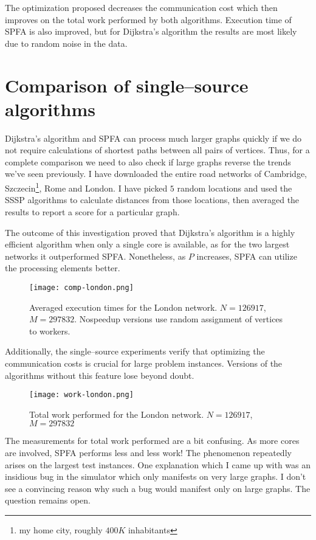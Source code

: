 \documentclass[12pt,a4paper,oneside,openright]{report}
\begin{document}
The optimization proposed decreases the communication cost which then improves on the total work performed by both algorithms. Execution time of SPFA is also improved, but for Dijkstra's algorithm the results are most likely due to random noise in the data.

\section{Comparison of single--source algorithms}
Dijkstra's algorithm and SPFA can process much larger graphs quickly if we do not require calculations of shortest paths between all pairs of vertices. Thus, for a complete comparison we need to also check if large graphs reverse the trends we've seen previously. I have downloaded the entire road networks of Cambridge, Szczecin\footnote{my home city, roughly $400K$ inhabitants}, Rome and London. I have picked $5$ random locations and used the SSSP algorithms to calculate distances from those locations, then averaged the results to report a score for a particular graph.

The outcome of this investigation proved that Dijkstra's algorithm is a highly efficient algorithm when only a single core is available, as for the two largest networks it outperformed SPFA. Nonetheless, as $P$ increases, SPFA can utilize the processing elements better.

\begin{figure}[ht]
\centering
\caption{Averaged execution times for the London network. $N=126917$, $M=297832$. Nospeedup versions use random assignment of vertices to workers.}
\texttt{[image: comp-london.png]}
\end{figure}

Additionally, the single--source experiments verify that optimizing the communication costs is crucial for large problem instances. Versions of the algorithms without this feature lose beyond doubt.

\begin{figure}[ht]
\centering
\caption{Total work performed for the London network. $N=126917$, $M=297832$}
\texttt{[image: work-london.png]}
\end{figure}

The measurements for total work performed are a bit confusing. As more cores are involved, SPFA performs less and less work! The phenomenon repeatedly arises on the largest test instances. One explanation which I came up with was an insidious bug in the simulator which only manifests on very large graphs. I don't see a convincing reason why such a bug would manifest only on large graphs. The question remains open. 
\end{document}

